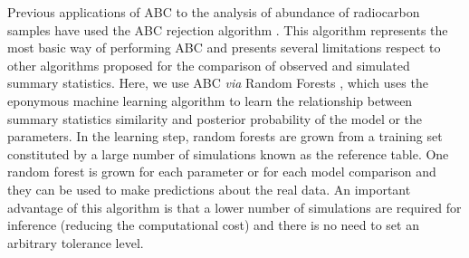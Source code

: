 \documentclass[a4paper]{article}
\begin{document}
Previous applications of ABC to the analysis of abundance of radiocarbon samples have used the ABC rejection algorithm \parencite{Porcic2020,DiNapoli2021}. This algorithm represents the most basic way of performing ABC and presents several limitations respect to other algorithms proposed for the comparison of observed and simulated summary statistics. Here, we use ABC \emph{via} Random Forests \parencite[ABCRF;][]{Pudlo2016, Raynal2019}, which uses the eponymous machine learning algorithm to learn the relationship between summary statistics similarity and posterior probability of the model or the parameters. In the learning step, random forests are grown from a training set constituted by a large number of simulations known as the reference table. One random forest is grown for each parameter or for each model comparison and they can be used to make predictions about the real data. An important advantage of this algorithm is that a lower number of simulations are required for inference (reducing the computational cost) and there is no need to set an arbitrary tolerance level. 
\\



\end{document}
